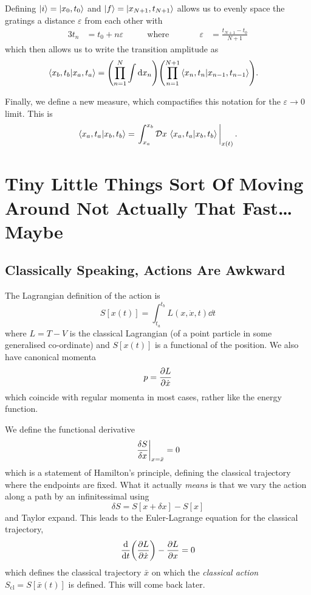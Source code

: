 \documentclass[]{scrreprt}
\newcommand{\DD}[1]{\ensuremath{\mathcal{D} #1\,}}
\begin{document}
Defining \(\ket{i} = \ket{x_0, t_0} \) and \( \ket{f} = \ket{x_{N+1}, t_{N+1}} \) allows us to evenly space the gratings a distance \( \varepsilon \) from each other with
\begin{alignat*}{3}
  t_n &= t_0 + n\varepsilon & \qquad \text{where}&\qquad& \varepsilon &= \frac{t_{N+1} - t_0}{N+1}
\end{alignat*}
which then allows us to write the transition amplitude as
\begin{align*}
  \braket{x_b, t_b}{x_a, t_a} &= \qty(\prod_{n=1}^{N}\int\dd{x_n})\qty(\prod_{n=1}^{N+1}\braket{x_{n}, t_{n}}{x_{n-1}, t_{n-1}}).
\end{align*}

Finally, we define a new measure, which compactifies this notation for the \(\varepsilon \to 0 \) limit.
This is \[ \braket{x_a, t_a}{x_b, t_b} =  \eval{\int_{x_a}^{x_b}\DD{x}\braket{x_a, t_a}{x_b, t_b}}_{x(t)}. \]

\chapter{Tiny Little Things Sort Of Moving Around Not Actually That Fast\ldots{} Maybe}
\section{Classically Speaking, Actions Are Awkward}
The Lagrangian definition of the action is \[ S[x(t)] = \int_{t_a}^{t_b} L(x, \dot{x}, t) \dd{t} \]
where \(L = T-V \) is the classical Lagrangian (of a point particle in some generalised co-ordinate) and \(S[x(t)]\) is a functional of the position. We also have canonical momenta \[ p = \pdv{L}{\dot{x}} \] which coincide with regular momenta in most cases, rather like the energy function.

We define the functional derivative
\[ \eval{\frac{\delta S}{\delta x}}_{x = \bar x} = 0 \] which is a statement of Hamilton's principle, defining the classical trajectory where the endpoints are fixed. What it actually \emph{means} is that we vary the action along a path by an infinitessimal using \[ \delta S = S[x + \delta x] - S[x] \] and Taylor expand. This leads to the Euler-Lagrange equation for the classical trajectory, \[ \dv{t}(\pdv{L}{\dot x}) - \pdv{L}{x} = 0 \] which defines the classical trajectory \(\bar{x} \) on which the \emph{classical action}
\(S_{\mathrm{cl}} = S[\bar x(t)]\) is defined. This will come back later.
\end{document}
